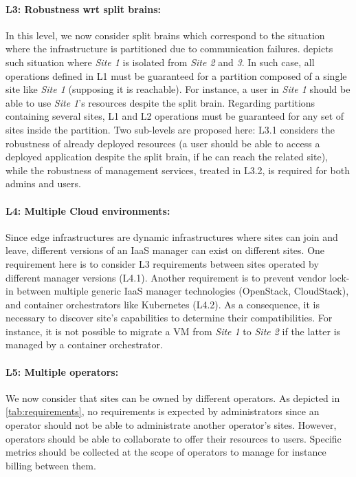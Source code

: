 \paragraph{L3: Robustness wrt split brains:}
In this level, we now consider split brains which correspond to the situation
where the infrastructure is partitioned due to communication failures.
 depicts such situation where \emph{Site 1} is isolated from
\emph{Site 2} and \emph{3}. In such case, all operations defined in L1 must be
guaranteed for a partition composed of a single site like \emph{Site 1}
(supposing it is reachable). For instance, a user in \emph{Site 1} should be
able to use \emph{Site 1}'s resources despite the split brain. Regarding
partitions containing several sites, L1 and L2 operations must be guaranteed
for any set of sites inside the partition.
Two sub-levels are proposed here: L3.1 considers the robustness of already
deployed resources (\eg a user should be able to access a deployed application
despite the split brain, if he can reach the related site), while the
robustness of management services, treated in L3.2, is required for both admins
and users.

\paragraph{L4: Multiple Cloud environments:}
Since edge infrastructures are dynamic infrastructures where sites can join and
leave, different versions of an IaaS manager can exist on different sites. One
requirement here is to consider L3 requirements between sites operated by
different manager versions (L4.1). Another requirement is to prevent vendor
lock-in between multiple generic IaaS manager technologies (\eg OpenStack,
CloudStack), and container orchestrators like Kubernetes (L4.2).
As a consequence, it is necessary to discover site's capabilities to determine
their compatibilities. For instance, it is not possible to migrate a VM from
\emph{Site 1} to \emph{Site 2} if the latter is managed by a container
orchestrator.

\paragraph{L5: Multiple operators:}
We now consider that sites can be owned by different operators. As depicted in
\cref{tab:requirements}, no requirements is expected by administrators since an
operator should not be able to administrate another operator's sites. However,
operators should be able to collaborate to offer their resources to users.
Specific metrics should be collected at the scope of operators to manage for
instance billing between them.

